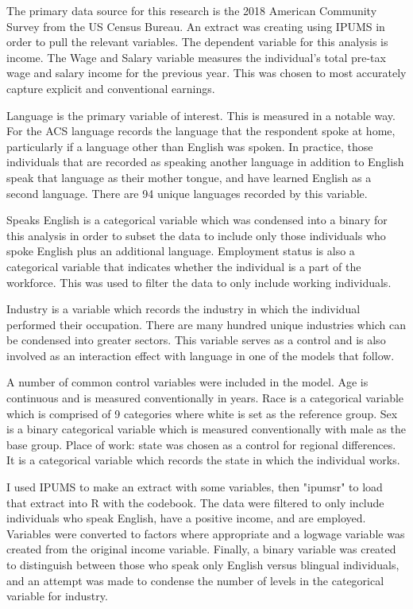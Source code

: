 \documentclass[12pt,english]{article}
\begin{document}
The primary data source for this research is the 2018 American Community Survey from the US Census Bureau. An extract was creating using IPUMS in order to pull the relevant variables. The dependent variable for this analysis is income. The Wage and Salary variable measures the individual's total pre-tax wage and salary income for the previous year. This was chosen to most accurately capture explicit and conventional earnings. 

Language is the primary variable of interest. This is measured in a notable way. For the ACS language records the language that the respondent spoke at home, particularly if a language other than English was spoken. In practice, those individuals that are recorded as speaking another language in addition to English speak that language as their mother tongue, and have learned English as a second language. There are 94 unique languages recorded by this variable. 

Speaks English is a categorical variable which was condensed into a binary for this analysis in order to subset the data to include only those individuals who spoke English plus an additional language. Employment status is also a categorical variable that indicates whether the individual is a part of the workforce. This was used to filter the data to only include working individuals.

Industry is a variable which records the industry in which the individual performed their occupation. There are many hundred unique industries which can be condensed into greater sectors. This variable serves as a control and is also involved as an interaction effect with language in one of the models that follow. 

A number of common control variables were included in the model. Age is continuous and is measured conventionally in years. Race is a categorical variable which is comprised of 9 categories where white is set as the reference group. Sex is a binary categorical variable which is measured conventionally with male as the base group. Place of work: state was chosen as a control for regional differences. It is a categorical variable which records the state in which the individual works. 

I used IPUMS to make an extract with some variables, then "ipumsr" to load that extract into R with the codebook. The data were filtered to only include individuals who speak English, have a positive income, and are employed. Variables were converted to factors where appropriate and a logwage variable was created from the original income variable. Finally, a binary variable was created to distinguish between those who speak only English versus blingual individuals, and an attempt was made to condense the number of levels in the categorical variable for industry.
\end{document}
